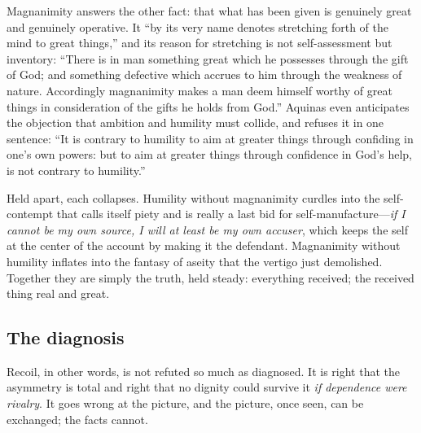 Magnanimity answers the other fact: that what has been given is genuinely great and genuinely operative. It ``by its very name denotes stretching forth of the mind to great things,'' and its reason for stretching is not self-assessment but inventory: ``There is in man something great which he possesses through the gift of God; and something defective which accrues to him through the weakness of nature. Accordingly magnanimity makes a man deem himself worthy of great things in consideration of the gifts he holds from God.'' Aquinas even anticipates the objection that ambition and humility must collide, and refuses it in one sentence: ``It is contrary to humility to aim at greater things through confiding in one's own powers: but to aim at greater things through confidence in God's help, is not contrary to humility.''

Held apart, each collapses. Humility without magnanimity curdles into the self-contempt that calls itself piety and is really a last bid for self-manufacture---\emph{if I cannot be my own source, I will at least be my own accuser}, which keeps the self at the center of the account by making it the defendant. Magnanimity without humility inflates into the fantasy of aseity that the vertigo just demolished. Together they are simply the truth, held steady: everything received; the received thing real and great.

\subsection{The diagnosis}

Recoil, in other words, is not refuted so much as diagnosed. It is right that the asymmetry is total and right that no dignity could survive it \emph{if dependence were rivalry}. It goes wrong at the picture, and the picture, once seen, can be exchanged; the facts cannot.

